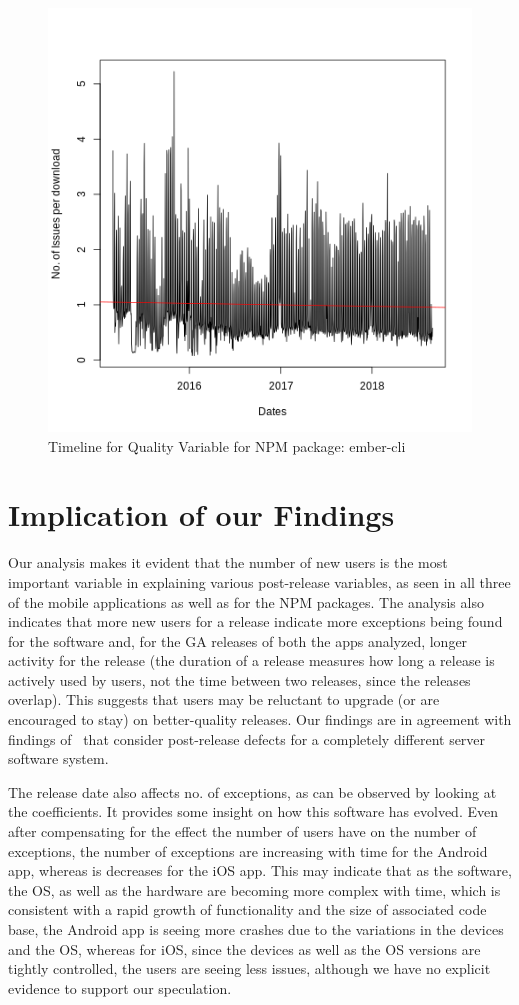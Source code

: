 \documentclass[smallextended]{svjour3}       %
\begin{document}
\begin{figure}[!t]
\centering
\includegraphics[width=0.5\linewidth]{ember-cli}
\caption{Timeline for Quality Variable for NPM package: ember-cli}
\label{fig:tNe}
\end{figure}


\section{Implication of our Findings}\label{s:implication}

Our analysis makes it evident that the number of new
users  is the most important variable in explaining various post-release variables, as seen in all three of the mobile applications as well as for the NPM packages. 
The analysis also indicates that more new users for a release indicate 
more exceptions being found for the software
and, for the GA releases of both the apps analyzed, longer activity for the release (the duration
of a release measures how long a release is actively used by users,
not the time between two releases, since the releases overlap).  This
suggests that users  may 
 be reluctant to upgrade (or are encouraged to stay) on better-quality releases.
 Our findings are in agreement with findings
of~\cite{IQ08,hmps15,mockus2005predictors} that consider 
post-release defects for a completely different server software system.

The release date also affects no. of exceptions, as can be observed by looking 
at the coefficients. It provides some insight on
how this software has evolved.  
Even after compensating for the effect the number of
users have on the number of exceptions, the number of exceptions are
increasing with time for the Android app, whereas is decreases for the iOS app. 
This may indicate that as the software, the OS, as well as the hardware are becoming 
more complex with time, which is consistent with a rapid growth of
functionality and the size of associated code base, the Android app is seeing more crashes due to the variations in the devices and the OS, whereas for iOS, since the devices as well as the OS versions are tightly controlled, the users are seeing less issues,   although we have no explicit evidence to support our speculation. 
\end{document}
